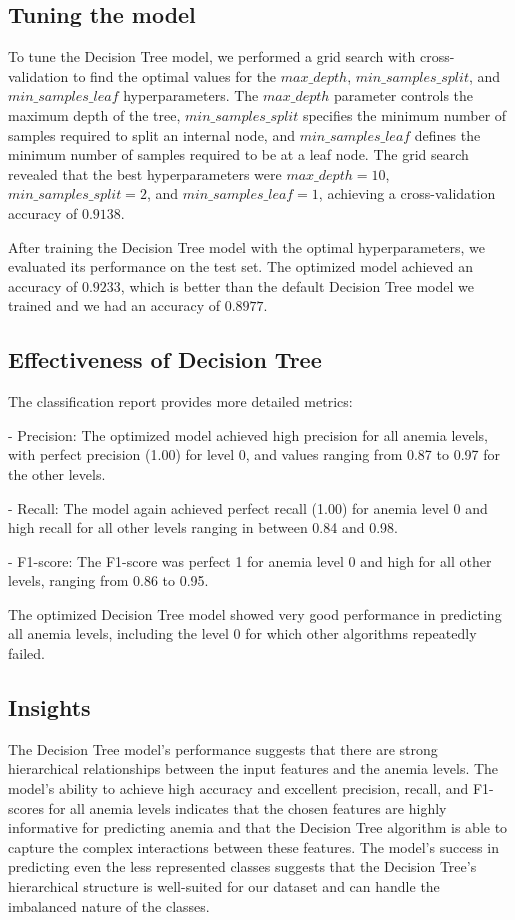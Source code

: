 \subsection{Tuning the model}

To tune the Decision Tree model, we performed a grid search with cross-validation to find the optimal values for the $max\_depth$, $min\_samples\_split$, and $min\_samples\_leaf$ hyperparameters. The $max\_depth$ parameter controls the maximum depth of the tree, $min\_samples\_split$ specifies the minimum number of samples required to split an internal node, and $min\_samples\_leaf$ defines the minimum number of samples required to be at a leaf node. The grid search revealed that the best hyperparameters were $max\_depth=10$, $min\_samples\_split=2$, and $min\_samples\_leaf=1$, achieving a cross-validation accuracy of $0.9138$.


After training the Decision Tree model with the optimal hyperparameters, we evaluated its performance on the test set. The optimized model achieved an accuracy of $0.9233$, which is better than the default Decision Tree model we trained and we had an accuracy of $0.8977$.

\subsection{Effectiveness of Decision Tree}


The classification report provides more detailed metrics:


- Precision: The optimized model achieved high precision for all anemia levels, with perfect precision (1.00) for level 0, and values ranging from 0.87 to 0.97 for the other levels.


- Recall: The model again achieved perfect recall (1.00) for anemia level 0 and high recall for all other levels ranging in between 0.84 and 0.98.


- F1-score: The F1-score was perfect 1 for anemia level 0 and high for all other levels, ranging from 0.86 to 0.95.

The optimized Decision Tree model showed very good performance in predicting all anemia levels, including the level 0 for which other algorithms repeatedly failed.


\subsection{Insights}

The Decision Tree model's performance suggests that there are strong hierarchical relationships between the input features and the anemia levels. The model's ability to achieve high accuracy and excellent precision, recall, and F1-scores for all anemia levels indicates that the chosen features are highly informative for predicting anemia and that the Decision Tree algorithm is able to capture the complex interactions between these features. The model's success in predicting even the less represented classes suggests that the Decision Tree's hierarchical structure is well-suited for our dataset and can handle the imbalanced nature of the classes.


